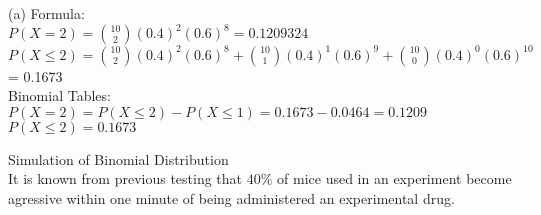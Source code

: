 \documentclass[bigtut]{tutorial}\usepackage[]{graphicx}\usepackage[]{color}
\makeatletter
\newcommand{\hlnum}[1]{\textcolor[rgb]{0.686,0.059,0.569}{#1}}%
\newcommand{\hlcom}[1]{\textcolor[rgb]{0.678,0.584,0.686}{\textit{#1}}}%
\newcommand{\hlstd}[1]{\textcolor[rgb]{0.345,0.345,0.345}{#1}}%
\newcommand{\hlkwd}[1]{\textcolor[rgb]{0.737,0.353,0.396}{\textbf{#1}}}%
\newenvironment{kframe}{%
 \def\at@end@of@kframe{}%
 \ifinner\ifhmode%
  \def\at@end@of@kframe{\end{minipage}}%
  \begin{minipage}{\columnwidth}%
 \fi\fi%
 \def\FrameCommand##1{\hskip\@totalleftmargin \hskip-\fboxsep
 \colorbox{shadecolor}{##1}\hskip-\fboxsep
     \hskip-\linewidth \hskip-\@totalleftmargin \hskip\columnwidth}%
 \MakeFramed {\advance\hsize-\width
   \@totalleftmargin\z@ \linewidth\hsize
   \@setminipage}}%
 {\par\unskip\endMakeFramed%
 \at@end@of@kframe}
\newenvironment{knitrout}{}{} %
\makeatother
\begin{document}
\begin{tutorial}
\begin{questions}


\begin{solution}
(a) 
Formula: \\
$P(X=2) = {10 \choose 2} (0.4)^2(0.6)^8 =0.1209324$ \\
$P(X \leq 2) = {10 \choose 2} (0.4)^2(0.6)^8 
+ {10 \choose 1} (0.4)^1(0.6)^9 + {10 \choose 0} (0.4)^0(0.6)^{10}$  = 0.1673 \\

Binomial Tables: \\
$P(X=2) = P(X \leq 2) - P(X \leq 1) = 0.1673-0.0464=0.1209$ \\
$P(X \leq 2) = 0.1673$ \\
\end{solution}



\question Simulation of Binomial Distribution \\

It is known from previous testing that $40 \%$ of mice used in an experiment become agressive within one minute of being administered an experimental drug.  \\

\begin{parts}


\end{parts}
\end{questions}
\end{tutorial}
\end{document}
